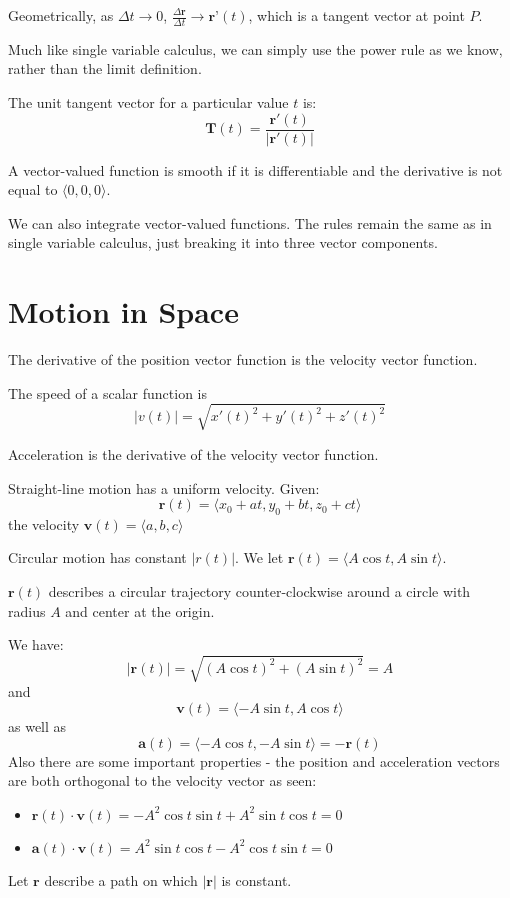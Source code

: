 \documentclass[../calc3.tex]{subfiles}
\begin{document}
Geometrically, as $\Delta t\rightarrow 0$, $\frac{\Delta \textbf{r}}{\Delta t}\rightarrow \textbf{r'}(t)$, which is a tangent vector at point $P$.

Much like single variable calculus, we can simply use the power rule as we know, rather than the limit definition.

The unit tangent vector for a particular value $t$ is:
\[\textbf{T}(t)=\frac{\textbf{r}'(t)}{|\textbf{r}'(t)|}\]

A vector-valued function is smooth if it is differentiable and the derivative is not equal to $\langle 0,0,0\rangle$.

We can also integrate vector-valued functions. The rules remain the same as in single variable calculus, just breaking it into three vector components.
\section{Motion in Space}
The derivative of the position vector function is the velocity vector function. 

The speed of a scalar function is 
\[|v(t)|=\sqrt{x'(t)^2+y'(t)^2+z'(t)^2}\]

Acceleration is the derivative of the velocity vector function.

Straight-line motion has a uniform velocity. Given:
\[\textbf{r}(t)=\langle x_0+at,y_0+bt,z_0+ct\rangle\]
the velocity $\textbf{v}(t) = \langle a,b,c\rangle$

Circular motion has constant $|r(t)|$. We let $\textbf{r}(t)=\langle A\cos t, A\sin t\rangle$.

$\textbf{r}(t)$ describes a circular trajectory counter-clockwise around a circle with radius $A$ and center at the origin.

We have:
\[|\textbf{r}(t)|=\sqrt{(A\cos t)^2+(A\sin t)^2}=A\]
and
\[\textbf{v}(t)=\langle -A\sin t, A\cos t\rangle\]
as well as
\[\textbf{a}(t)=\langle -A\cos t, -A\sin t\rangle=-\textbf{r}(t)\]
Also there are some important properties - the position and acceleration vectors are both orthogonal to the velocity vector as seen:
\begin{itemize}
    \item $\textbf{r}(t)\cdot\textbf{v}(t)=-A^2\cos t\sin t+A^2\sin t \cos t = 0$
    \item $\textbf{a}(t)\cdot\textbf{v}(t)=A^2\sin t\cos t-A^2\cos t\sin t = 0$
\end{itemize}

Let $\textbf{r}$ describe a path on which $|\textbf{r}|$ is constant.
\end{document}
